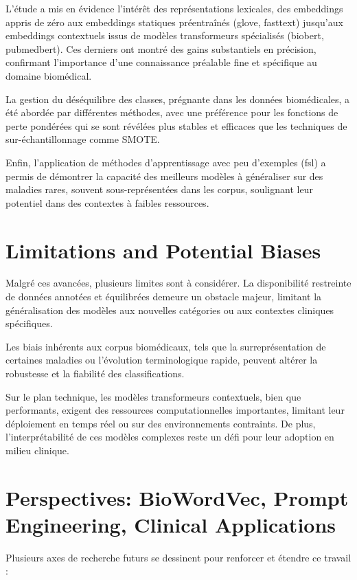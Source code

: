 \documentclass[12pt]{report}
\begin{document}
L’étude a mis en évidence l’intérêt des représentations lexicales, des embeddings appris de zéro aux embeddings statiques préentraînés (\gls{glove}, \gls{fasttext}) jusqu’aux embeddings contextuels issus de modèles transformeurs spécialisés (\gls{biobert}, \gls{pubmedbert}). Ces derniers ont montré des gains substantiels en précision, confirmant l’importance d’une connaissance préalable fine et spécifique au domaine biomédical.

La gestion du déséquilibre des classes, prégnante dans les données biomédicales, a été abordée par différentes méthodes, avec une préférence pour les fonctions de perte pondérées qui se sont révélées plus stables et efficaces que les techniques de sur-échantillonnage comme SMOTE.

Enfin, l’application de méthodes d’apprentissage avec peu d’exemples (\gls{fsl}) a permis de démontrer la capacité des meilleurs modèles à généraliser sur des maladies rares, souvent sous-représentées dans les corpus, soulignant leur potentiel dans des contextes à faibles ressources.

\section{Limitations and Potential Biases}

Malgré ces avancées, plusieurs limites sont à considérer. La disponibilité restreinte de données annotées et équilibrées demeure un obstacle majeur, limitant la généralisation des modèles aux nouvelles catégories ou aux contextes cliniques spécifiques. 

Les biais inhérents aux corpus biomédicaux, tels que la surreprésentation de certaines maladies ou l’évolution terminologique rapide, peuvent altérer la robustesse et la fiabilité des classifications. 

Sur le plan technique, les modèles transformeurs contextuels, bien que performants, exigent des ressources computationnelles importantes, limitant leur déploiement en temps réel ou sur des environnements contraints. De plus, l’interprétabilité de ces modèles complexes reste un défi pour leur adoption en milieu clinique.

\section{Perspectives: BioWordVec, Prompt Engineering, Clinical Applications}

Plusieurs axes de recherche futurs se dessinent pour renforcer et étendre ce travail :
\end{document}
